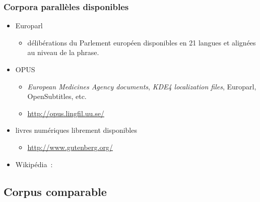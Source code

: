 \begin{frame}
\frametitle{Corpora parallèles disponibles}

\begin{itemize} \itemsep0.8em
    \item Europarl~\cite{koehn2005europarl}
    \begin{itemize}
        \item délibérations du Parlement européen disponibles en 21 langues et 
              alignées au niveau de la phrase.
    \end{itemize}
    \item OPUS~\cite{tiedemann2009news}
    \begin{itemize}
        \item \textit{European Medicines Agency documents}, 
              \textit{KDE4 localization files}, Europarl, OpenSubtitles, etc.
        \item \url{http://opus.lingfil.uu.se/}
    \end{itemize}
    \item livres numériques librement disponibles
    \begin{itemize}
        \item \url{http://www.gutenberg.org/}
    \end{itemize}
    \item Wikipédia~: \alert{}
\end{itemize}

\end{frame}


\subsection{Corpus comparable}


